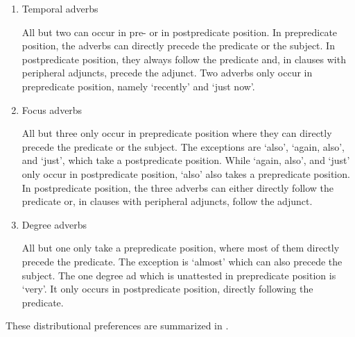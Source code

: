 \begin{enumerate}
\item 
Temporal adverbs

\begin{styleIiI}
All but two can occur in pre- or in postpredicate position. In prepredicate position, the adverbs can directly precede the predicate or the subject. In postpredicate position, they always follow the predicate and, in clauses with peripheral adjuncts, precede the adjunct. Two adverbs only occur in prepredicate position, namely  ‘recently’ and  ‘just now’.
\end{styleIiI}


\item 
Focus adverbs

\begin{styleIiI}
All but three only occur in prepredicate position where they can directly precede the predicate or the subject. The exceptions are  ‘also’,  ‘again, also’, and  ‘just’, which take a postpredicate position. While  ‘again, also’, and  ‘just’ only occur in postpredicate position,  ‘also’ also takes a prepredicate position. In postpredicate position, the three adverbs can either directly follow the predicate or, in clauses with peripheral adjuncts, follow the adjunct.
\end{styleIiI}


\item 
Degree adverbs

\begin{styleIiI}
All but one only take a prepredicate position, where most of them directly precede the predicate. The exception is  ‘almost’ which can also precede the subject. The one degree ad which is unattested in prepredicate position is  ‘very’. It only occurs in postpredicate position, directly following the predicate.
\end{styleIiI}
\end{enumerate}

These distributional preferences are summarized in .


